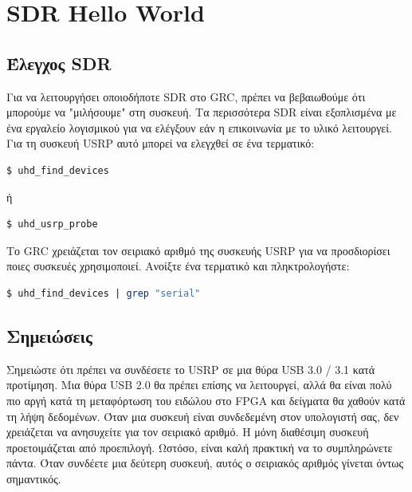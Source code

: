 \documentclass[12pt]{report}
\begin{document}
    \section*{\textsf{SDR Hello World}}
        \subsection*{Έλεγχος SDR}
            Για να λειτουργήσει οποιοδήποτε SDR στο GRC, πρέπει να βεβαιωθούμε ότι μπορούμε να
            "μιλήσουμε" στη συσκευή. Τα περισσότερα SDR είναι εξοπλισμένα με ένα εργαλείο λογισμικού
            για να ελέγξουν εάν η επικοινωνία με το υλικό λειτουργεί. Για τη συσκευή USRP αυτό 
            μπορεί να ελεγχθεί σε ένα τερματικό:
            
            \begin{lstlisting}[language=bash]
                $ uhd_find_devices
            \end{lstlisting}
            ή
            \begin{lstlisting}[language=bash]
                $ uhd_usrp_probe
            \end{lstlisting}

            Το GRC χρειάζεται τον σειριακό αριθμό της συσκευής USRP για να προσδιορίσει ποιες
            συσκευές χρησιμοποιεί. Ανοίξτε ένα τερματικό και πληκτρολογήστε:

            \begin{lstlisting}[language=bash]
                $ uhd_find_devices | grep "serial"
            \end{lstlisting}

        \subsection*{\textsf{Σημειώσεις}}
            Σημειώστε ότι πρέπει να συνδέσετε το USRP σε μια θύρα USB 3.0 / 3.1 κατά προτίμηση. 
            Μια θύρα USB 2.0 θα πρέπει επίσης να λειτουργεί, αλλά θα είναι πολύ πιο αργή κατά τη
            μεταφόρτωση του ειδώλου στο FPGA και δείγματα θα χαθούν κατά τη λήψη δεδομένων.
            Όταν μια συσκευή είναι συνδεδεμένη στον υπολογιστή σας, δεν χρειάζεται να ανησυχείτε για τον
            σειριακό αριθμό. Η μόνη διαθέσιμη συσκευή προετοιμάζεται από προεπιλογή. Ωστόσο, είναι καλή
            πρακτική να το συμπληρώνετε πάντα. Όταν συνδέετε μια δεύτερη συσκευή, αυτός ο σειριακός αριθμός
            γίνεται όντως σημαντικός.
\end{document}
